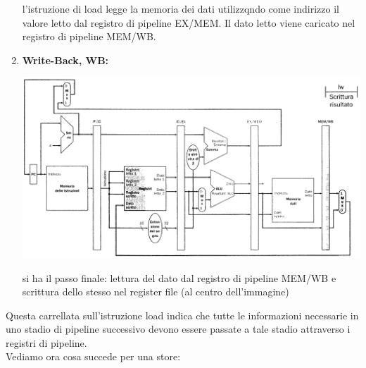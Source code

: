 \documentclass[a4paper,12pt, oneside]{book}
\begin{document}
\begin{enumerate}
  l'istruzione di load legge la memoria dei dati utilizzqndo come
  indirizzo il valore letto dal registro di pipeline
  EX/MEM. Il dato letto viene caricato nel registro di pipeline
  MEM/WB.
  \item \textbf{Write-Back, WB:}
  \begin{center}
    \includegraphics[scale = 0.7]{img/pipe8.png}
  \end{center}
  si ha il passo finale: lettura del dato dal registro di pipeline
  MEM/WB e scrittura dello stesso nel register file (al centro dell'immagine)
\end{enumerate}
Questa carrellata sull'istruzione load indica che tutte le informazioni necessarie
in uno stadio di pipeline successivo devono essere passate a tale
stadio attraverso i registri di pipeline.\\
Vediamo ora cosa succede per una store:
\end{document}
